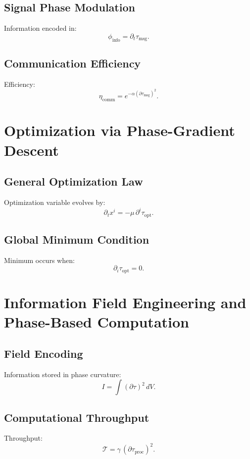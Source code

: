 \section{Signal Phase Modulation}
Information encoded in:
\[
\phi_{\mathrm{info}} = \partial_t \tau_{\mathrm{msg}}.
\]

\section{Communication Efficiency}
Efficiency:
\[
\eta_{\mathrm{comm}} = e^{-\alpha (\partial\tau_{\mathrm{msg}})^2}.
\]

\chapter{Optimization via Phase-Gradient Descent}

\section{General Optimization Law}
Optimization variable evolves by:
\[
\partial_t x^i = -\mu\,\partial^i\tau_{\mathrm{opt}}.
\]

\section{Global Minimum Condition}
Minimum occurs when:
\[
\partial_i \tau_{\mathrm{opt}} = 0.
\]

\chapter{Information Field Engineering and Phase-Based Computation}

\section{Field Encoding}
Information stored in phase curvature:
\[
I = \int (\partial\tau)^2\, dV.
\]

\section{Computational Throughput}
Throughput:
\[
\mathcal{T} = \gamma\,(\partial\tau_{\mathrm{proc}})^2.
\]
